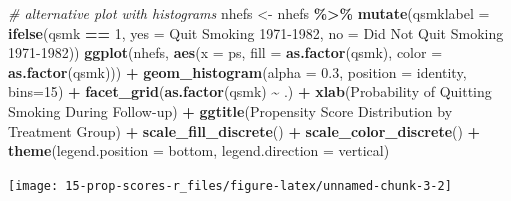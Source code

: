 \documentclass[
  10pt,
]{book}
\newenvironment{Shaded}{\begin{snugshade}}{\end{snugshade}}
\newcommand{\CommentTok}[1]{\textcolor[rgb]{0.56,0.35,0.01}{\textit{#1}}}
\newcommand{\DataTypeTok}[1]{\textcolor[rgb]{0.13,0.29,0.53}{#1}}
\newcommand{\DecValTok}[1]{\textcolor[rgb]{0.00,0.00,0.81}{#1}}
\newcommand{\FloatTok}[1]{\textcolor[rgb]{0.00,0.00,0.81}{#1}}
\newcommand{\KeywordTok}[1]{\textcolor[rgb]{0.13,0.29,0.53}{\textbf{#1}}}
\newcommand{\NormalTok}[1]{#1}
\newcommand{\OperatorTok}[1]{\textcolor[rgb]{0.81,0.36,0.00}{\textbf{#1}}}
\newcommand{\StringTok}[1]{\textcolor[rgb]{0.31,0.60,0.02}{#1}}
\begin{document}
\begin{Shaded}
\begin{Highlighting}[]
\CommentTok{\# alternative plot with histograms}
\NormalTok{nhefs \textless{}{-}}\StringTok{ }\NormalTok{nhefs }\OperatorTok{\%\textgreater{}\%}\StringTok{ }\KeywordTok{mutate}\NormalTok{(}\DataTypeTok{qsmklabel =} \KeywordTok{ifelse}\NormalTok{(qsmk }\OperatorTok{==}\StringTok{ }\DecValTok{1}\NormalTok{,}
                       \DataTypeTok{yes =} \StringTok{\textquotesingle{}Quit Smoking 1971{-}1982\textquotesingle{}}\NormalTok{,}
                       \DataTypeTok{no =} \StringTok{\textquotesingle{}Did Not Quit Smoking 1971{-}1982\textquotesingle{}}\NormalTok{))}
\KeywordTok{ggplot}\NormalTok{(nhefs, }\KeywordTok{aes}\NormalTok{(}\DataTypeTok{x =}\NormalTok{ ps, }\DataTypeTok{fill =} \KeywordTok{as.factor}\NormalTok{(qsmk), }\DataTypeTok{color =} \KeywordTok{as.factor}\NormalTok{(qsmk))) }\OperatorTok{+}
\StringTok{  }\KeywordTok{geom\_histogram}\NormalTok{(}\DataTypeTok{alpha =} \FloatTok{0.3}\NormalTok{, }\DataTypeTok{position =} \StringTok{\textquotesingle{}identity\textquotesingle{}}\NormalTok{, }\DataTypeTok{bins=}\DecValTok{15}\NormalTok{) }\OperatorTok{+}
\StringTok{  }\KeywordTok{facet\_grid}\NormalTok{(}\KeywordTok{as.factor}\NormalTok{(qsmk) }\OperatorTok{\textasciitilde{}}\StringTok{ }\NormalTok{.) }\OperatorTok{+}
\StringTok{  }\KeywordTok{xlab}\NormalTok{(}\StringTok{\textquotesingle{}Probability of Quitting Smoking During Follow{-}up\textquotesingle{}}\NormalTok{) }\OperatorTok{+}
\StringTok{  }\KeywordTok{ggtitle}\NormalTok{(}\StringTok{\textquotesingle{}Propensity Score Distribution by Treatment Group\textquotesingle{}}\NormalTok{) }\OperatorTok{+}
\StringTok{  }\KeywordTok{scale\_fill\_discrete}\NormalTok{(}\StringTok{\textquotesingle{}\textquotesingle{}}\NormalTok{) }\OperatorTok{+}
\StringTok{  }\KeywordTok{scale\_color\_discrete}\NormalTok{(}\StringTok{\textquotesingle{}\textquotesingle{}}\NormalTok{) }\OperatorTok{+}
\StringTok{  }\KeywordTok{theme}\NormalTok{(}\DataTypeTok{legend.position =} \StringTok{\textquotesingle{}bottom\textquotesingle{}}\NormalTok{, }\DataTypeTok{legend.direction =} \StringTok{\textquotesingle{}vertical\textquotesingle{}}\NormalTok{)}
\end{Highlighting}
\end{Shaded}

\begin{center}\texttt{[image: 15-prop-scores-r\_files/figure-latex/unnamed-chunk-3-2]} \end{center}
\end{document}
